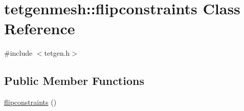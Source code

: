 \hypertarget{classtetgenmesh_1_1flipconstraints}{}\section{tetgenmesh\+:\+:flipconstraints Class Reference}
\label{classtetgenmesh_1_1flipconstraints}


{\ttfamily \#include $<$tetgen.\+h$>$}

\subsection*{Public Member Functions}
\begin{DoxyCompactItemize}
\item 
\hyperlink{classtetgenmesh_1_1flipconstraints_a4bd90cc95400ddb895ad45d7e5b72f4e}{flipconstraints} ()
\end{DoxyCompactItemize}
